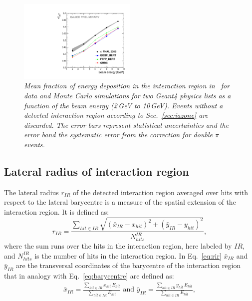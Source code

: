 \begin{figure}
	\centering
	\includegraphics[width=0.5\textwidth]{ECAL/plots/e-ir-graph.pdf}
	\caption{\label{fig:irgraph} \sl  Mean fraction of energy deposition in the interaction region in \ecal\ for data and  Monte Carlo simulations for two {\sc Geant}4 physics lists as a function of the beam energy (2\,GeV to 10\,GeV). Events without a detected interaction region according to Sec.~\ref{sec:iazone} are discarded. The error bars represent statistical uncertainties and the error band the systematic error from the correction for double $\pi$ events.}
\end{figure}
\subsection{Lateral radius of interaction region}
The lateral radius $r_{IR}$  of the detected interaction region averaged over hits with respect to the lateral barycentre is a measure of the spatial extension of the interaction region. 
It is defined as:
\begin{equation}
r_{IR} = \frac{\displaystyle \sum_{hit \in IR} \sqrt{(\bar{x}_{IR} - x_{hit})^2 + (\bar{y}_{IR} - y_{hit})^2}} {\displaystyle N_{hits}^{IR}},
\label{eq:rir}
\end{equation}
where the sum runs over the hits in the interaction region, here labeled by $IR$, and $N_{hits}^{IR}$ is the number of hits in the interaction region. In Eq.~\ref{eq:rir} $\bar{x}_{IR}$ and $\bar{y}_{IR}$ are the transversal coordinates of the barycentre of the interaction region that in analogy with Eq.~\ref{eq:barycentre} are defined as: 
\begin{eqnarray}
\label{eq:barycentre2}
\bar{x}_{IR} = \frac{\displaystyle \sum_{hit \in IR} x_{hit}\,E_{hit}}{\displaystyle \sum_{hit \in IR} E_{hit}} 
\text{ and }
\bar{y}_{IR} = \frac{\displaystyle \sum_{hit \in IR} y_{hit}\,E_{hit}}{\displaystyle \sum_{hit \in IR} E_{hit}},
\end{eqnarray}

